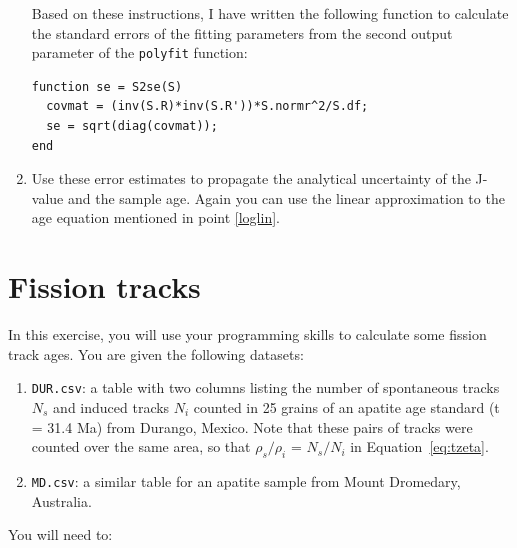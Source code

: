 \documentclass{book}
\begin{document}
\begin{enumerate}
Based on these instructions, I have written the following function to
calculate the standard errors of the fitting parameters from the
second output parameter of the \texttt{polyfit} function:

\begin{verbatim}
function se = S2se(S)
  covmat = (inv(S.R)*inv(S.R'))*S.normr^2/S.df;
  se = sqrt(diag(covmat));
end
\end{verbatim}

\item Use these error estimates to propagate the analytical
  uncertainty of the J-value and the sample age. Again you can use the
  linear approximation to the age equation mentioned in point
  \ref{loglin}.

\end{enumerate}

\section{Fission tracks}
\label{sec:FT-R}

In this exercise, you will use your programming skills to calculate
some fission track ages. You are given the following datasets:

\begin{enumerate}
\item\texttt{DUR.csv}: a table with two columns listing the number of
  spontaneous tracks $N_s$ and induced tracks $N_i$ counted in 25
  grains of an apatite age standard (t = 31.4 Ma) from Durango,
  Mexico.  Note that these pairs of tracks were counted over the same
  area, so that $\rho_s/\rho_i$ = $N_s/N_i$ in
  Equation~\ref{eq:tzeta}.
\item\texttt{MD.csv}: a similar table for an apatite sample from Mount
  Dromedary, Australia.
\end{enumerate}

You will need to:
\end{document}

